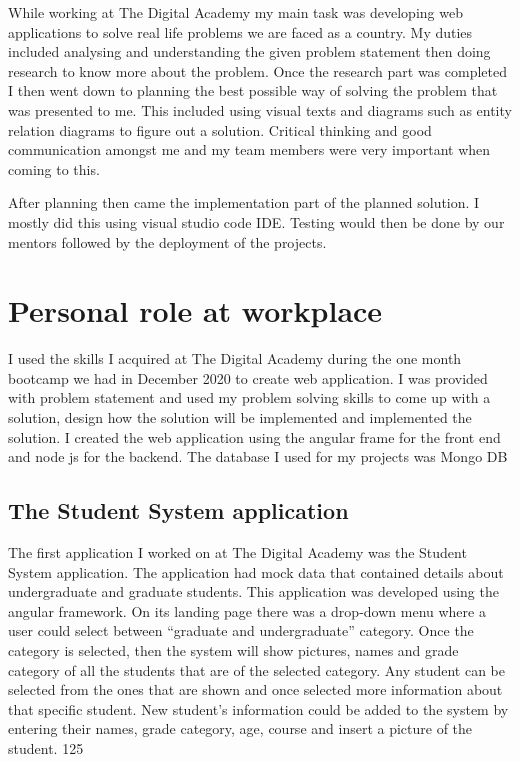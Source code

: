 \documentclass[paper=a4, fontsize=11pt]{scrartcl}
\numberwithin{equation}{section}		%
\numberwithin{figure}{section}			%
\numberwithin{table}{section}				%
\begin{document}
While working at The Digital Academy my main task was developing web applications to solve real life problems we are faced as a country. My duties included analysing and understanding the given problem statement then doing research to know more about the problem. Once the research part was completed I then went down to planning the best possible way of solving the problem that was presented to me. This included using visual texts and diagrams such as entity relation diagrams to figure out a solution. Critical thinking and good communication amongst me and my team members were very important when coming to this. 

After planning then came the implementation part of the planned solution. I mostly did this using visual studio code IDE. Testing would then be done by our mentors followed by the deployment of the projects. 

\section{ Personal role at workplace }
I used the skills I acquired at The Digital Academy during the one month bootcamp we had in December 2020 to create web application. I was provided with problem statement and used my problem solving skills to come up with a solution, design how the solution will be implemented and implemented the solution. I created the web application using the angular frame for the front end and node js for the backend. The database I used for my projects was Mongo DB 

\subsection{ The Student System application}
The first application I worked on at The Digital Academy was the Student System application. The application had mock data that contained details about undergraduate and graduate students. This application was developed using the angular framework. On its landing page there was a drop-down menu where a user could select between “graduate and undergraduate” category. Once the category is selected, then the system will show pictures, names and grade category of all the students that are of the selected category.
Any student can be selected from the ones that are shown and once selected more information about that specific student. New student’s information could be added to the system by entering their names, grade category, age, course and insert a picture of the student. 125
\end{document}

